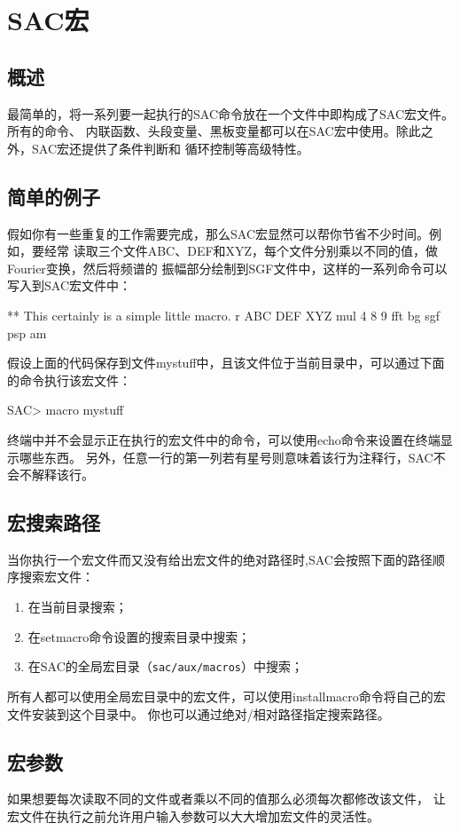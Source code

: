 \section{SAC宏}
\subsection{概述}
最简单的，将一系列要一起执行的SAC命令放在一个文件中即构成了SAC宏文件。所有的命令、
内联函数、头段变量、黑板变量都可以在SAC宏中使用。除此之外，SAC宏还提供了条件判断和
循环控制等高级特性。

\subsection{简单的例子}
假如你有一些重复的工作需要完成，那么SAC宏显然可以帮你节省不少时间。例如，要经常
读取三个文件ABC、DEF和XYZ，每个文件分别乘以不同的值，做Fourier变换，然后将频谱的
振幅部分绘制到SGF文件中，这样的一系列命令可以写入到SAC宏文件中：
\begin{SACCode}
** This certainly is a simple little macro.
r ABC DEF XYZ
mul 4 8 9
fft
bg sgf
psp am
\end{SACCode}

假设上面的代码保存到文件mystuff中，且该文件位于当前目录中，可以通过下面的命令执行该宏文件：
\begin{SACCode}
SAC> macro mystuff
\end{SACCode}
终端中并不会显示正在执行的宏文件中的命令，可以使用echo命令来设置在终端显示哪些东西。
另外，任意一行的第一列若有星号则意味着该行为注释行，SAC不会不解释该行。

\subsection{宏搜索路径}
当你执行一个宏文件而又没有给出宏文件的绝对路径时,SAC会按照下面的路径顺序搜索宏文件：
\begin{enumerate}
\item 在当前目录搜索；
\item 在setmacro命令设置的搜索目录中搜索；
\item 在SAC的全局宏目录（\texttt{sac/aux/macros}）中搜索；
\end{enumerate}

所有人都可以使用全局宏目录中的宏文件，可以使用installmacro命令将自己的宏文件安装到这个目录中。
你也可以通过绝对/相对路径指定搜索路径。

\subsection{宏参数}
如果想要每次读取不同的文件或者乘以不同的值那么必须每次都修改该文件，
让宏文件在执行之前允许用户输入参数可以大大增加宏文件的灵活性。

